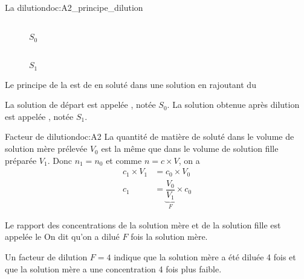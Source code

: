 \newpage
\vspace*{-36pt}
\begin{doc}{La dilution}{doc:A2_principe_dilution}
  \begin{wrapfigure}[5]{r}{0.5\linewidth}
    \vspace*{-30pt}
    \centering
    \begin{multicols}{4}
     \\[-0pt]
    \footnotesize{$S_0$}
    
    
    
     \\[-0pt]
    \footnotesize{$S_1$}
    \end{multicols}
  \end{wrapfigure}
  \vAligne{-40pt}
  
  \begin{importants}
    Le principe de la  est de  en soluté dans une solution en rajoutant du 
  \end{importants}
  La solution de départ est appelée , notée $S_0$.
  La solution obtenue après dilution est appelée , notée $S_1$.
\end{doc}

\begin{doc}{Facteur de dilution}{doc:A2}
  La quantité de matière de soluté dans le volume de solution mère prélevée $V_0$ est la même que dans le volume de solution fille préparée $V_1$. Donc $n_1 = n_0$ et comme $n = c \times V$, on a
  \begin{align*}
    c_1 \times V_1 &= c_0 \times V_0 \\
    c_1 &= \underbrace{\dfrac{V_0}{V_1}}_{F} \times c_0
  \end{align*}

  \begin{importants}  
    Le rapport des concentrations de la solution mère et de la solution fille est appelée le 
    On dit qu'on a dilué $F$ fois la solution mère.
  \end{importants}
  \exemple Un facteur de dilution $F = 4$ indique que la solution mère a été diluée 4 fois et que la solution mère a une concentration 4 fois plus faible.
\end{doc}

